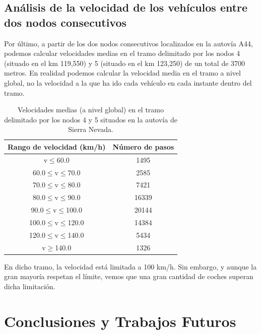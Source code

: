 \documentclass[twocolumn,twoside]{Jornadas}
\begin{document}
\subsection{Análisis de la velocidad de los vehículos entre dos nodos consecutivos}

Por último, a partir de los dos nodos consecutivos localizados en la autovía A44, podemos calcular velocidades medias en el tramo delimitado por los nodos 4 (situado en el km 119,550) 
y 5 (situado en el km 123,250) de un total de 3700 metros. 
En realidad podemos calcular la velocidad media en el tramo a nivel global, no la velocidad a la que ha ido cada vehículo en cada instante dentro del tramo.

 \begin{table}
 \caption{Velocidades medias (a nivel global) en el tramo delimitado por los nodos 4 y 5 situados en la autovía de Sierra Nevada.
 \label{velocidad}}
 \begin{center}
 \begin{tabular}{|c|c|}
 \hline
Rango de velocidad (km/h) &  Número de pasos  \\
 \hline
v$\leq$60.0	& 1495  \\
 \hline
60.0$\leq$v$\leq$70.0 & 2585  \\
 \hline
70.0$\leq$v$\leq$80.0 & 7421  \\
 \hline
80.0$\leq$v$\leq$90.0 & 16339  \\
 \hline
90.0$\leq$v$\leq$100.0 & 20144  \\
 \hline
100.0$\leq$v$\leq$120.0 & 14384  \\
 \hline
120.0$\leq$v$\leq$140.0 & 5434  \\
 \hline
v$\geq$140.0 & 1326  \\
 \hline
 \end{tabular}
 \end{center}
 \end{table}


En dicho tramo, la velocidad está limitada a 100 km/h. Sin embargo, y aunque la gran mayoría respetan el límite, vemos que una gran cantidad de coches superan dicha limitación.



\section{Conclusiones y Trabajos Futuros}
\label{conclus}
\end{document}
